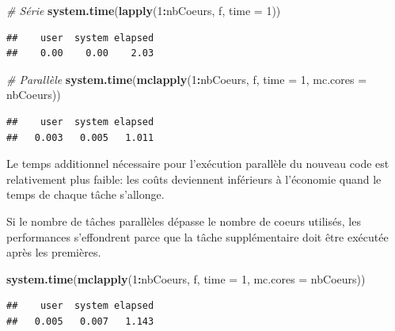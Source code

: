 \documentclass[
  12pt,
  french,
  a4paper,
  extrafontsizes,onecolumn,openright
  ]{memoir}
\newenvironment{Shaded}{\begin{snugshade}}{\end{snugshade}}
\newcommand{\CommentTok}[1]{\textcolor[rgb]{0.56,0.35,0.01}{\textit{#1}}}
\newcommand{\DataTypeTok}[1]{\textcolor[rgb]{0.13,0.29,0.53}{#1}}
\newcommand{\DecValTok}[1]{\textcolor[rgb]{0.00,0.00,0.81}{#1}}
\newcommand{\KeywordTok}[1]{\textcolor[rgb]{0.13,0.29,0.53}{\textbf{#1}}}
\newcommand{\NormalTok}[1]{#1}
\newcommand{\OperatorTok}[1]{\textcolor[rgb]{0.81,0.36,0.00}{\textbf{#1}}}
\newlength{\rf}
\begin{document}
\scriptsize

\begin{Shaded}
\begin{Highlighting}[]
\CommentTok{# Série}
\KeywordTok{system.time}\NormalTok{(}\KeywordTok{lapply}\NormalTok{(}\DecValTok{1}\OperatorTok{:}\NormalTok{nbCoeurs, f, }\DataTypeTok{time =} \DecValTok{1}\NormalTok{))}
\end{Highlighting}
\end{Shaded}

\begin{verbatim}
##    user  system elapsed 
##    0.00    0.00    2.03
\end{verbatim}

\begin{Shaded}
\begin{Highlighting}[]
\CommentTok{# Parallèle}
\KeywordTok{system.time}\NormalTok{(}\KeywordTok{mclapply}\NormalTok{(}\DecValTok{1}\OperatorTok{:}\NormalTok{nbCoeurs, f, }\DataTypeTok{time =} \DecValTok{1}\NormalTok{, }\DataTypeTok{mc.cores =}\NormalTok{ nbCoeurs))}
\end{Highlighting}
\end{Shaded}

\begin{verbatim}
##    user  system elapsed 
##   0.003   0.005   1.011
\end{verbatim}

\normalsize

Le temps additionnel nécessaire pour l'exécution parallèle du nouveau code est relativement plus faible: les coûts deviennent inférieurs à l'économie quand le temps de chaque tâche s'allonge.

Si le nombre de tâches parallèles dépasse le nombre de coeurs utilisés, les performances s'effondrent parce que la tâche supplémentaire doit être exécutée après les premières.

\scriptsize

\begin{Shaded}
\begin{Highlighting}[]
\KeywordTok{system.time}\NormalTok{(}\KeywordTok{mclapply}\NormalTok{(}\DecValTok{1}\OperatorTok{:}\NormalTok{nbCoeurs, f, }\DataTypeTok{time =} \DecValTok{1}\NormalTok{, }\DataTypeTok{mc.cores =}\NormalTok{ nbCoeurs))}
\end{Highlighting}
\end{Shaded}

\begin{verbatim}
##    user  system elapsed 
##   0.005   0.007   1.143
\end{verbatim}
\end{document}
